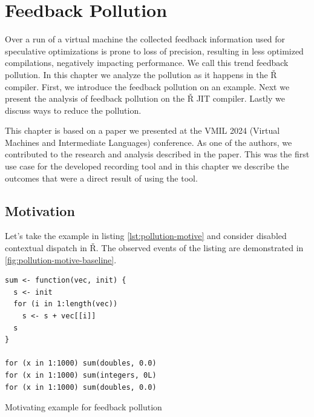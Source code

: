 \chapter{Feedback Pollution}

\begin{chapterabstract}
  Over a run of a virtual machine the collected feedback information used for speculative optimizations is prone to loss of precision, resulting in less optimized compilations, negatively impacting performance. We call this trend feedback pollution. In this chapter we analyze the pollution as it happens in the Ř compiler. First, we introduce the feedback pollution on an example. Next we present the analysis of feedback pollution on the Ř JIT compiler. Lastly we discuss ways to reduce the pollution.
\end{chapterabstract}

This chapter is based on a paper we presented at the VMIL 2024 (Virtual Machines and Intermediate Languages) conference\cite{feedback-vmil}. As one of the authors, we contributed to the research and analysis described in the paper. This was the first use case for the developed recording tool and in this chapter we describe the outcomes that were a direct result of using the tool.

\section{Motivation}

Let's take the example in listing \ref{lst:pollution-motive} and consider disabled contextual dispatch in Ř. The observed events of the listing are demonstrated in \ref{fig:pollution-motive-baseline}.

\begin{listing}
	\begin{verbatim}
sum <- function(vec, init) {
  s <- init
  for (i in 1:length(vec))
    s <- s + vec[[i]]
  s
}

for (x in 1:1000) sum(doubles, 0.0)
for (x in 1:1000) sum(integers, 0L)
for (x in 1:1000) sum(doubles, 0.0)
  \end{verbatim}
	\caption{Motivating example for feedback pollution}\label{lst:pollution-motive}
\end{listing}


